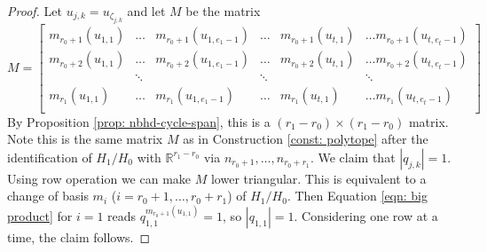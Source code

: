 \documentclass{article}
\def\R{\mathbb{R}}
\begin{document}
\begin{proof}
    Let $u_{j,k}=u_{\zeta_{j,k}}$ and 
    let $M$ be the matrix 
    $$M = \begin{bmatrix}
        m_{r_0+1}(u_{1,1}) & \ldots &  m_{r_0+1}(u_{1,e_1-1}) & \ldots & m_{r_0+1}(u_{t,1}) & \ldots m_{r_0+1}(u_{t,e_t-1}) \\
        m_{r_0+2}(u_{1,1}) & \ldots &  m_{r_0+2}(u_{1,e_1-1}) & \ldots & m_{r_0+2}(u_{t,1}) & \ldots m_{r_0+2}(u_{t,e_t-1}) \\
         & \ddots &  & \ddots &  & \ddots  \\
        m_{r_1}(u_{1,1}) & \ldots &  m_{r_1}(u_{1,e_1-1}) & \ldots & m_{r_1}(u_{t,1}) & \ldots m_{r_1}(u_{t,e_t-1}) \\
    \end{bmatrix}$$
    By Proposition \ref{prop: nbhd-cycle-span}, this is a $(r_1 - r_0) \times (r_1 - r_0)$ matrix. Note this is the same matrix $M$ as in Construction \ref{const: polytope} after the identification of $H_1/H_0$ with $\R^{r_1-r_0}$ via $n_{r_0+1},\ldots,n_{r_0+r_1}$. We claim that $|q_{j,k}| = 1$. Using row operation we can make $M$ lower triangular. This is equivalent to a change of basis $m_i$ ($i=r_0+1,\ldots,r_0+r_1$) of $H_1/H_0$. Then Equation \eqref{eqn: big product} for $i=1$ reads $q_{1,1}^{m_{r_0+1}(u_{1,1})} = 1$, so $|q_{1,1}| = 1$. Considering one row at a time, the claim follows. 
    

\end{proof}
\end{document}
